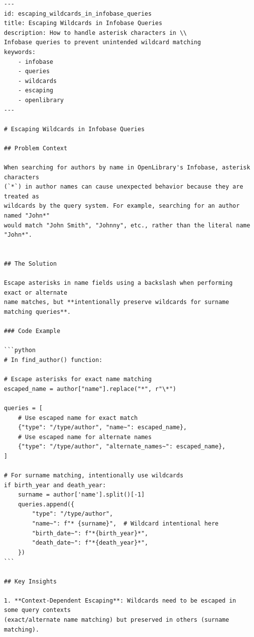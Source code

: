 \begin{tcolorbox}[colback=white,  %
                   colframe=black,    %
                   coltext=metablue,      %
                   breakable,
                   fontupper=\scriptsize\fontfamily{pcr}\selectfont]  %
\begin{verbatim}
---
id: escaping_wildcards_in_infobase_queries
title: Escaping Wildcards in Infobase Queries
description: How to handle asterisk characters in \\
Infobase queries to prevent unintended wildcard matching
keywords:
    - infobase
    - queries
    - wildcards
    - escaping
    - openlibrary
---

# Escaping Wildcards in Infobase Queries

## Problem Context

When searching for authors by name in OpenLibrary's Infobase, asterisk characters 
(`*`) in author names can cause unexpected behavior because they are treated as 
wildcards by the query system. For example, searching for an author named "John*" 
would match "John Smith", "Johnny", etc., rather than the literal name "John*". 


## The Solution

Escape asterisks in name fields using a backslash when performing exact or alternate 
name matches, but **intentionally preserve wildcards for surname matching queries**. 

### Code Example

```python
# In find_author() function:

# Escape asterisks for exact name matching
escaped_name = author["name"].replace("*", r"\*")

queries = [
    # Use escaped name for exact match
    {"type": "/type/author", "name~": escaped_name},
    # Use escaped name for alternate names
    {"type": "/type/author", "alternate_names~": escaped_name},
]

# For surname matching, intentionally use wildcards
if birth_year and death_year:
    surname = author['name'].split()[-1]
    queries.append({
        "type": "/type/author",
        "name~": f"* {surname}",  # Wildcard intentional here
        "birth_date~": f"*{birth_year}*",
        "death_date~": f"*{death_year}*",
    })
```

## Key Insights

1. **Context-Dependent Escaping**: Wildcards need to be escaped in some query contexts
(exact/alternate name matching) but preserved in others (surname matching).


\end{verbatim}
\end{tcolorbox}
